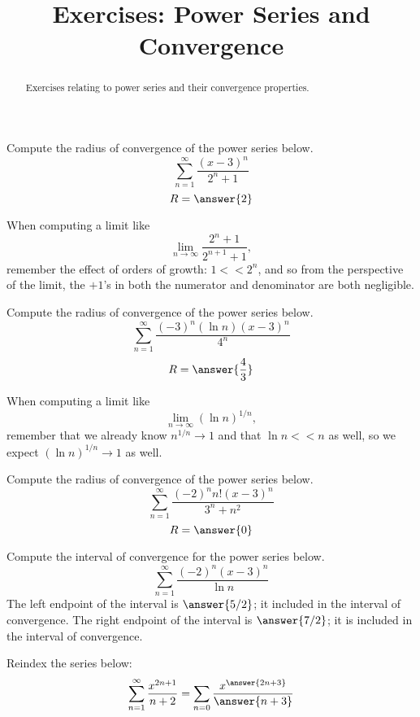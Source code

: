 \documentclass{ximera}
\title{Exercises: Power Series and Convergence}
\begin{document}
\begin{abstract}
Exercises relating to power series and their convergence properties.
\end{abstract}
\maketitle

\begin{exercise}
Compute the radius of convergence of the power series below.
\[ \sum_{n = 1}^\infty \frac{(x-3)^n}{2^n + 1} \]
\[ R = \answer{2} \]
\begin{hint}
When computing a limit like
\[ \lim_{n \rightarrow \infty} \frac{2^{n} + 1}{2^{n+1} + 1}, \]
remember the effect of orders of growth: $1 <\!\!< 2^n$, and so from the perspective of the limit, the $+1$'s in both the numerator and denominator are both negligible.
\end{hint}
\end{exercise}

\begin{exercise}
Compute the radius of convergence of the power series below.
\[ \sum_{n = 1}^\infty \frac{(-3)^n (\ln n) (x-3)^n}{4^n} \]
\[ R = \answer{\frac{4}{3}} \]
\begin{hint}
When computing a limit like
\[ \lim_{n \rightarrow \infty} (\ln n)^{1/n}, \]
remember that we already know $n^{1/n} \rightarrow 1$ and that $\ln n <\!\!<n$ as well, so we expect $(\ln n)^{1/n} \rightarrow 1$ as well.
\end{hint}
\end{exercise}

\begin{exercise}
Compute the radius of convergence of the power series below.
\[ \sum_{n = 1}^\infty \frac{(-2)^n n! (x-3)^n}{3^n+n^2} \]
\[ R = \answer{0} \]
\end{exercise}

\begin{exercise}
Compute the interval of convergence for the power series below.
\[ \sum_{n=1}^\infty \frac{(-2)^n (x-3)^n}{\ln n} \]
The left endpoint of the interval is $\answer{5/2}$; it  included in the interval of convergence.
The right endpoint of the interval is $\answer{7/2}$; it is  included in the interval of convergence.
\end{exercise}

\begin{exercise}
Reindex the series below:
\[ \sum_{n=1}^\infty \frac{x^{2n+1}}{n + 2} = \sum_{n = 0} \frac{x^{\answer{2n+3}}}{\answer{n+3}} \]
\end{exercise}
\end{document}

